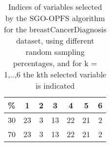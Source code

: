 \begin{table}
	\begin{center}
		\begin{tabular}{c c c c c c c}
			\% & 1 & 2 & 3 & 4 & 5 & 6 \\
			\hline
			30 & 23 & 3 & 13 & 22 & 21 & 2 \\
			70 & 23 & 3 & 13 & 22 & 21 & 2 \\
		\end{tabular}
	\end{center}
	\caption{Indices of variables selected by the SGO-OPFS algorithm for the breastCancerDiagnosis dataset, using different random sampling percentages, and for k = 1,..,6 the kth selected variable is indicated}
\end{table}